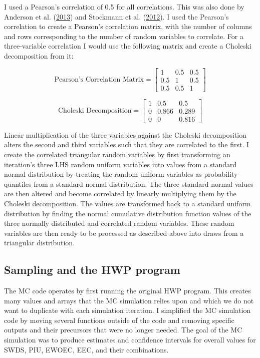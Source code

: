 \documentclass[
  openany]{book}
\begin{document}
I used a Pearson's correlation of 0.5 for all correlations. This was
also done by Anderson et al.
(\protect\hyperlink{ref-anderson2013}{2013}) and Stockmann et al.
(\protect\hyperlink{ref-stockmann2012}{2012}). I used the Pearson's
correlation to create a Pearson's correlation matrix, with the number of
columns and rows corresponding to the number of random variables to
correlate. For a three-variable correlation I would use the following
matrix and create a Choleski decomposition from it:

\[ \text{Pearson's Correlation Matrix} = \begin{bmatrix}
       1 & 0.5 & 0.5           \\
       0.5 & 1  & 0.5 \\
       0.5 & 0.5 & 1
     \end{bmatrix}
\]

\[ \text{Choleski Decomposition} = \begin{bmatrix}
       1 & 0.5 & 0.5           \\
       0 & 0.866  & 0.289 \\
       0 & 0 & 0.816
     \end{bmatrix}
\]

Linear multiplication of the three variables against the Choleski
decomposition alters the second and third variables such that they are
correlated to the first. I create the correlated triangular random
variables by first transforming an iteration's three LHS random uniform
variables into values from a standard normal distribution by treating
the random uniform variables as probability quantiles from a standard
normal distribution. The three standard normal values are then altered
and become correlated by linearly multiplying them by the Choleski
decomposition. The values are transformed back to a standard uniform
distribution by finding the normal cumulative distribution function
values of the three normally distributed and correlated random
variables. These random variables are then ready to be processed as
described above into draws from a triangular distribution.

\hypertarget{model-mc-samphwp}{%
\subsection{Sampling and the HWP program}\label{model-mc-samphwp}}

The MC code operates by first running the original HWP program. This
creates many values and arrays that the MC simulation relies upon and
which we do not want to duplicate with each simulation iteration. I
simplified the MC simulation code by moving several functions outside of
the code and removing specific outputs and their precursors that were no
longer needed. The goal of the MC simulation was to produce estimates
and confidence intervals for overall values for SWDS, PIU, EWOEC, EEC,
and their combinations.
\end{document}
